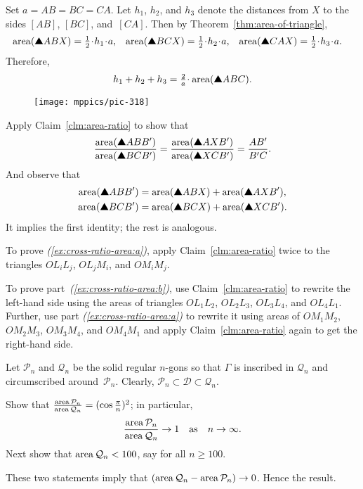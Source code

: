 Set $a=AB=BC=CA$.
Let $h_1$, $h_2$, and $h_3$ denote the distances from $X$ to the sides $[AB]$, $[BC]$, and~$[CA]$. 
Then by Theorem~\ref{thm:area-of-triangle},
\begin{align*}
\area(\solidtriangle ABX)&=\tfrac12\cdot h_1\cdot a,
&
\area(\solidtriangle BCX)&=\tfrac12\cdot h_2\cdot a,
&
\area(\solidtriangle CAX)&=\tfrac12\cdot h_3\cdot a.
\end{align*}
Therefore, 
\[h_1+h_2+h_3=\tfrac2a\cdot\area(\solidtriangle ABC).\]

\begin{wrapfigure}{r}{40 mm}
\vskip4mm
\centering
\texttt{[image: mppics/pic-318]}
\end{wrapfigure}

 Apply Claim~\ref{clm:area-ratio} to show that 
\[\frac{\area(\solidtriangle ABB')}{\area(\solidtriangle BCB')}=
\frac{\area(\solidtriangle AXB')}{\area(\solidtriangle XCB')}=
\frac{AB'}{B'C}.\]
And observe that 
\begin{align*}
\area(\solidtriangle ABB')&=\area(\solidtriangle ABX)+\area(\solidtriangle AXB'),
\\
\area(\solidtriangle BCB')&=\area(\solidtriangle BCX)+\area(\solidtriangle XCB').
\end{align*}
It implies the first identity; the rest is analogous.

To prove \textit{(\ref{ex:cross-ratio-area:a})}, apply Claim~\ref{clm:area-ratio} twice to the triangles $OL_iL_j$, $OL_jM_i$, and $OM_iM_j$.

To prove part~\textit{(\ref{ex:cross-ratio-area:b})}, use Claim~\ref{clm:area-ratio} to rewrite the left-hand side using the areas of triangles $OL_1L_2$, $OL_2L_3$, $OL_3L_4$, and $OL_4L_1$.
Further, use part \textit{(\ref{ex:cross-ratio-area:a})} to rewrite it using areas of $OM_1M_2$, $OM_2M_3$, $OM_3M_4$, and $OM_4M_1$ and apply Claim~\ref{clm:area-ratio} again to get the right-hand side.


Let $\mathcal{P}_n$ and $\mathcal{Q}_n$ be the solid regular $n$-gons
so that $\Gamma$ is inscribed in $\mathcal{Q}_n$ and circumscribed around~$\mathcal{P}_n$.
Clearly,
$\mathcal{P}_n\subset\mathcal{D}\subset\mathcal{Q}_n$.

Show that 
$\tfrac{\mathop{\rm area}\nolimits\mathcal{P}_n}{\mathop{\rm area}\nolimits\mathcal{Q}_n}=(\cos\tfrac\pi n)^2$;
in particular, 
$$\frac{\mathop{\rm area}\nolimits\mathcal{P}_n}{\mathop{\rm area}\nolimits\mathcal{Q}_n}\to 1
\quad
\text{as}
\quad
n\to\infty.$$
Next show that $\mathop{\rm area}\nolimits\mathcal{Q}_n<100$, say for all $n\ge 100$.

These two statements imply that
$(\mathop{\rm area}\nolimits\mathcal{Q}_n-\mathop{\rm area}\nolimits\mathcal{P}_n)\to 0$.
Hence the result.

\newpage
